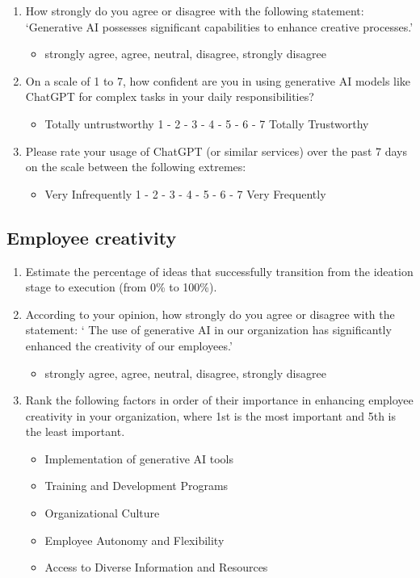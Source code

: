 \documentclass[UTF8,a4paper,AutoFakeBold,AutoFakeSlant]{article}
\begin{document}
\begin{enumerate}
    \item How strongly do you agree or disagree with the following statement: ‘Generative AI possesses significant capabilities to enhance creative processes.’
    \begin{itemize}
        \item strongly agree, agree, neutral, disagree, strongly disagree
    \end{itemize}
    \item On a scale of 1 to 7, how confident are you in using generative AI models like ChatGPT for complex tasks in your daily responsibilities?
    \begin{itemize}
        \item Totally untrustworthy 1 - 2 - 3 - 4 - 5 - 6 - 7 Totally Trustworthy
    \end{itemize}
    \item  Please rate your usage of ChatGPT (or similar services) over the past 7 days on the scale between the following extremes:
    \begin{itemize}
        \item Very Infrequently 1 - 2 - 3 - 4 - 5 - 6 - 7 Very Frequently
    \end{itemize}
\end{enumerate}


\subsection{Employee creativity}

\begin{enumerate}
    \item Estimate the percentage of ideas that successfully transition from the ideation stage to execution (from 0\% to 100\%).
    \item According to your opinion, how strongly do you agree or disagree with the statement: ‘ The use of generative AI in our organization has significantly enhanced the creativity of our employees.’
    \begin{itemize}
        \item strongly agree, agree, neutral, disagree, strongly disagree
    \end{itemize}
    \item Rank the following factors in order of their importance in enhancing employee creativity in your organization, where 1st is the most important and 5th is the least important.
    \begin{itemize}
        \item Implementation of generative AI tools
        \item Training and Development Programs
        \item Organizational Culture
        \item Employee Autonomy and Flexibility
        \item Access to Diverse Information and Resources
    \end{itemize}
\end{enumerate}
\end{document}
